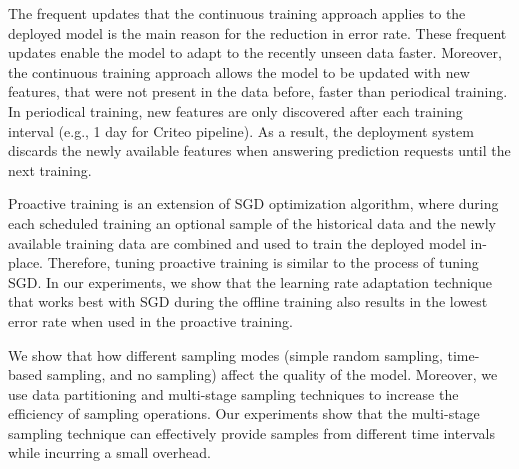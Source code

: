 The frequent updates that the continuous training approach applies to the deployed model is the main reason for the reduction in error rate.
These frequent updates enable the model to adapt to the recently unseen data faster.
Moreover, the continuous training approach allows the model to be updated with new features, that were not present in the data before, faster than periodical training.
In periodical training, new features are only discovered after each training interval (e.g., 1 day for Criteo pipeline).
As a result, the deployment system discards the newly available features when answering prediction requests until the next training.

Proactive training is an extension of SGD optimization algorithm, where during each scheduled training an optional sample of the historical data and the newly available training data are combined and used to train the deployed model in-place.
Therefore, tuning proactive training is similar to the process of tuning SGD.
In our experiments, we show that the learning rate adaptation technique that works best with SGD during the offline training also results in the lowest error rate when used in the proactive training.

We show that how different sampling modes (simple random sampling, time-based sampling, and no sampling) affect the quality of the model.
Moreover, we use data partitioning and multi-stage sampling techniques to increase the efficiency of sampling operations.
Our experiments show that the multi-stage sampling technique can effectively provide samples from different time intervals while incurring a small overhead.




